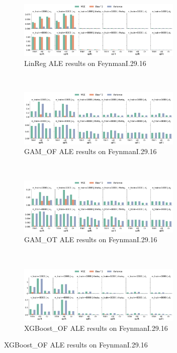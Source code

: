 \documentclass[runningheads]{llncs}
\begin{document}
\begin{figure}[ht!]
    \centering
    \begin{subfigure}[b]{\textwidth}
        \centering
        \includegraphics[width=0.86\textwidth]{img/FeynmanI.29.16-all/feature_effect_errors_ale_LinReg.png}
        \caption{LinReg ALE results on FeynmanI.29.16}
    \end{subfigure}
    \\[10pt]
    \vfill
    \begin{subfigure}[b]{\textwidth}
        \centering
        \includegraphics[width=0.86\textwidth]{img/FeynmanI.29.16-all/feature_effect_errors_ale_GAM_OF.png}
        \caption{GAM\_OF ALE results on FeynmanI.29.16}
    \end{subfigure}
    \\[10pt]
    \vfill
    \begin{subfigure}[b]{\textwidth}
        \centering
        \includegraphics[width=0.86\textwidth]{img/FeynmanI.29.16-all/feature_effect_errors_ale_GAM_OT.png}
        \caption{GAM\_OT ALE results on FeynmanI.29.16}
    \end{subfigure}
    \\[10pt]
    \vfill
    \begin{subfigure}[b]{\textwidth}
        \centering
        \includegraphics[width=0.86\textwidth]{img/FeynmanI.29.16-all/feature_effect_errors_ale_XGBoost_OF.png}
        \caption{XGBoost\_OF ALE results on FeynmanI.29.16}
    \end{subfigure}
\end{figure}
\end{document}

